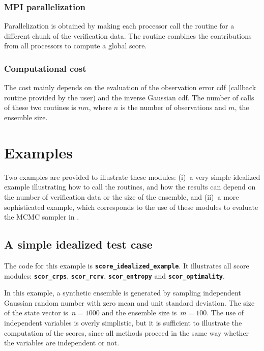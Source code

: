 \documentclass[11pt]{article}
\begin{document}
\subsubsection*{MPI parallelization}

Parallelization is obtained by making each processor call the routine
for a different chunk of the verification data.
The routine combines the contributions from all processors
to compute a global score.

\subsubsection*{Computational cost}

The cost mainly depends on the evaluation of the observation error cdf
(callback routine provided by the user) and the inverse Gaussian cdf.
The number of calls of these two routines is $n m$,
where $n$ is the number of observations and $m$, the ensemble size.

\clearpage

\section{Examples}

Two examples are provided to illustrate these modules:
(i)~a very simple idealized example illustrating how to call the routines,
and how the results can depend on the number of verification data or the size of the ensemble, and
(ii)~a more sophisticated example, which corresponds to the use of these modules
to evaluate the MCMC sampler in \citep{BRAN19}.

\subsection{A simple idealized test case}

The code for this example is {\tt\bf score\_idealized\_example}.
It illustrates all score modules: {\tt\bf scor\_crps}, {\tt\bf scor\_rcrv},
{\tt\bf scor\_entropy} and {\tt\bf scor\_optimality}.

In this example, a synthetic ensemble is generated
by sampling independent Gaussian random number
with zero mean and unit standard deviation.
The size of the state vector is~$n=1000$ and the ensemble size is~$m=100$.
The use of independent variables is overly simplistic,
but it is sufficient to illustrate the computation of the scores,
since all methods proceed in the same way
whether the variables are independent or not.
\end{document}
